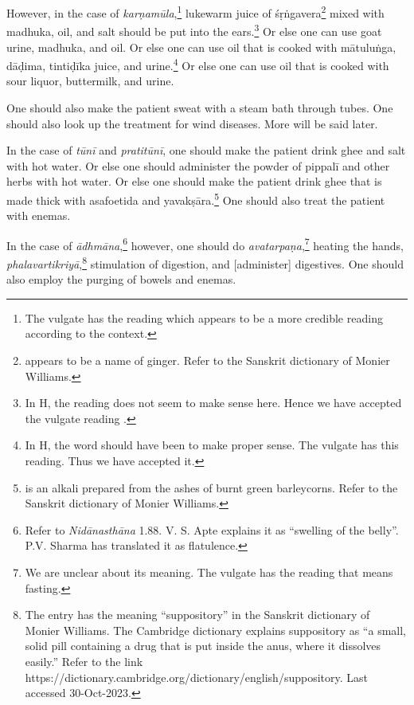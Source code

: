\begin{translation}
\begin{tt}
However, in the case of \textit{karṇamūla},\footnote{The vulgate has
    the reading  which appears to be a more credible
    reading according to the context.} lukewarm juice of
    \gls{śṛṅgavera}\footnote{ appears to be a name of
        ginger. Refer to the Sanskrit dictionary of Monier Williams.} mixed
        with \gls{madhuka}, oil, and salt should be put into the
        ears.\footnote{In H, the reading  does not seem to make
            sense here. Hence we have accepted the vulgate reading .}
            Or else one can use goat urine, \gls{madhuka}, and oil. Or else one
            can use oil that is cooked with \gls{mātuluṅga}, \gls{dāḍima},
            \gls{tintiḍīka} juice, and urine.\footnote{In H, the word 
                should have been  to make proper sense. The vulgate has
                this reading. Thus we have accepted it.} Or else one can use oil that
                is cooked with sour liquor, buttermilk, and urine.

One should also make the patient sweat with a steam bath through
tubes. One should also look up the treatment for wind diseases. More
will be said later.

\item[25]

In the case of \textit{tūnī} and \textit{pratitūnī}, one should make
the patient drink ghee and salt with hot water. Or else one should
administer the powder of \gls{pippalī} and other herbs with hot water.
Or else one should make the patient drink ghee that is made thick with
asafoetida and \gls{yavakṣāra}.\footnote{ is an alkali
    prepared from the ashes of burnt green barleycorns. Refer to the
    Sanskrit dictionary of Monier Williams.} One should also treat the
    patient with enemas.

\item[26]

In the case of \textit{ādhmāna},\footnote{Refer to
    \textit{Nidānasthāna} 1.88. V. S. Apte explains it as
    \enquote{swelling of the belly}. P.V. Sharma has translated it as
    flatulence.} however, one should do \textit{avatarpaṇa},\footnote{We
        are unclear about its meaning. The vulgate has the reading
         that means fasting.} heating the hands,
        \textit{phalavartikriyā},\footnote{The entry  has the
            meaning \enquote{suppository} in the Sanskrit dictionary of Monier
            Williams. The Cambridge dictionary explains suppository as \enquote{a
            small, solid pill containing a drug that is put inside the anus, where
            it dissolves easily.} Refer to the link
            https://dictionary.cambridge.org/dictionary/english/suppository. Last
            accessed 30-Oct-2023.} stimulation of digestion, and [administer]
            digestives. One should also employ the purging of bowels and enemas.


\end{tt}
\end{translation}
